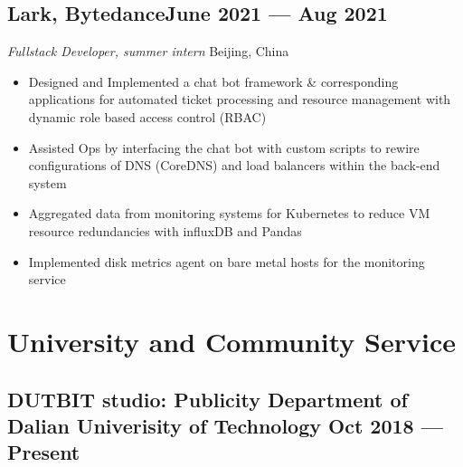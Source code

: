 \documentclass[a4,12pt]{article}
\newcommand{\subtext}[1]{
#1\par\vspace{-0.3cm}}
\newenvironment{zitemize}{
\begin{itemize}\itemsep0pt \parskip0pt \parsep1pt}
{\end{itemize}\vspace{-0.5cm}}
\begin{document}
\subsection*{Lark, Bytedance\hfill June 2021 --- Aug 2021} 
\subtext{\textit{Fullstack Developer, summer intern } \hfill Beijing, China} 
    \begin{zitemize}
        \item Designed and Implemented a chat bot framework \& corresponding applications for automated ticket processing and resource management with dynamic role based access control (RBAC)
        \item Assisted Ops by interfacing the chat bot with custom scripts to rewire configurations of DNS (CoreDNS) and load balancers within the back-end system
        \item Aggregated data from monitoring systems for Kubernetes to reduce VM resource redundancies with influxDB and Pandas
        \item Implemented disk metrics agent on bare metal hosts for the monitoring service
    \end{zitemize}


\section{\textbf{University and Community Service}} %



\subsection*{DUTBIT studio: {\normalsize\normalfont Publicity Department of Dalian Univerisity of Technology} \hfill  Oct 2018 --- Present} 
\end{document}
